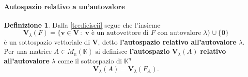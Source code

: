 \documentclass{article}
\theoremstyle{plain}
\theoremstyle{definition}
\newtheorem{defn}{Definizione}[section]
\theoremstyle{remark}
\begin{document}
\vspace{10pt}

\paragraph{Autospazio relativo a un'autovalore}
\begin{bxthm}
\begin{defn}
Dalla \ref{trediciseii} segue che l'insieme
\[
\mathbf{V}_\lambda(F) = \{\mathbf{v} \in \mathbf{V} \,:\; \mathbf{v} \text{ è un autovettore di } F \text{ con autovalore } \lambda \} \cup \{\mathbf{0}\}
\]
è un sottospazio vettoriale di $\mathbf{V}$, detto \textbf{l'autospazio relativo all'autovalore} $\lambda$. 
Per una matrice $A \in M_n(\mathbb{K})$ si definisce \textbf{l'autospazio} $\mathbf{V}_\lambda(A)$ \textbf{relativo all'autovalore} $\lambda$ come il sottospazio di $\mathbb{K}^n$ 
\[\mathbf{V}_\lambda(A) = \mathbf{V}_\lambda(F_A).\]
\end{defn}
\end{bxthm}

\vspace{10pt}
\end{document}

